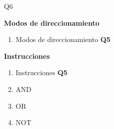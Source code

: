 {Q6}

\textbf{Modos de direccionamiento}
\begin{enumerate}
\item Modos de direccionamiento \textbf{Q5}
\end{enumerate}

\textbf{Instrucciones}
\begin{enumerate}
\item Instrucciones \textbf{Q5}
\item AND
\item OR
\item NOT
\end{enumerate}


